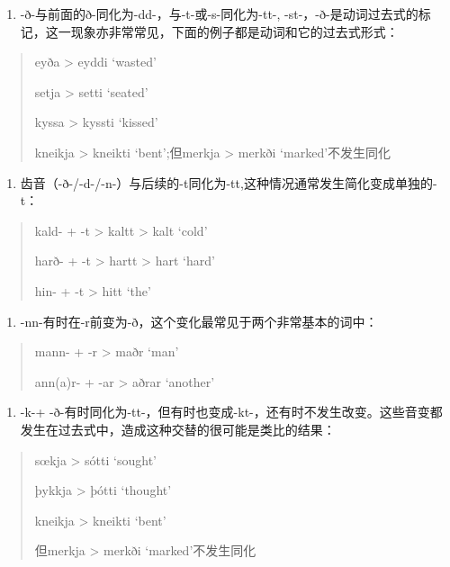 \begin{enumerate}
\def\labelenumi{(\alph{enumi})}
\setcounter{enumi}{1}
\item
  -ð-与前面的ð-同化为-dd-，与-t-或-s-同化为-tt-,
  -st-，-ð-是动词过去式的标记，这一现象亦非常常见，下面的例子都是动词和它的过去式形式：
\end{enumerate}

\begin{quote}
eyða \textgreater{} eyddi `wasted'

setja \textgreater{} setti `seated'

kyssa \textgreater{} kyssti `kissed'

kneikja \textgreater{} kneikti `bent';但merkja \textgreater{} merkði
`marked'不发生同化
\end{quote}

\begin{enumerate}
\def\labelenumi{(\alph{enumi})}
\setcounter{enumi}{2}
\item
  齿音（-ð-/-d-/-n-）与后续的-t同化为-tt,这种情况通常发生简化变成单独的-t：
\end{enumerate}

\begin{quote}
kald- + -t \textgreater{} kaltt \textgreater{} kalt `cold'

harð- + -t \textgreater{} hartt \textgreater{} hart `hard'

hin- + -t \textgreater{} hitt `the'
\end{quote}

\begin{enumerate}
\def\labelenumi{(\alph{enumi})}
\setcounter{enumi}{3}
\item
  -nn-有时在-r前变为-ð，这个变化最常见于两个非常基本的词中：
\end{enumerate}

\begin{quote}
mann- + -r \textgreater{} maðr `man'

ann(a)r- + -ar \textgreater{} aðrar `another'
\end{quote}

\begin{enumerate}
\def\labelenumi{(\alph{enumi})}
\setcounter{enumi}{4}
\item
  -k-+
  -ð-有时同化为-tt-，但有时也变成-kt-，还有时不发生改变。这些音变都发生在过去式中，造成这种交替的很可能是类比的结果：
\end{enumerate}

\begin{quote}
sœkja \textgreater{} sótti `sought'

þykkja \textgreater{} þótti `thought'

kneikja \textgreater{} kneikti `bent'

但merkja \textgreater{} merkði `marked'不发生同化
\end{quote}

